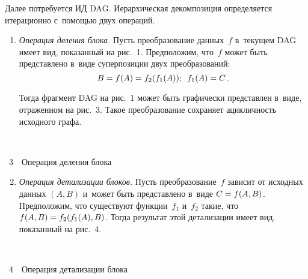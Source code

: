 \begin{multicols}{2}
  Далее потребуется ИД DAG. Иерархическая декомпозиция определяется 
итерационно с~по\-мощью двух операций. 




  \begin{enumerate}[1.]
  \item \textit{Операция деления блока.} Пусть преобразование данных~$f$ 
в~текущем DAG имеет вид, показанный на рис.~1. Предположим, что~$f$ может 
быть представлено в~виде суперпозиции двух преобразований: 
$$
B\hm= f(A)\hm= 
f_2(f_1(A));\enskip  f_1(A)\hm=C\,.
$$ 

Тогда фрагмент DAG на рис.~1 может быть 
графически представлен в~виде, отраженном на рис.~3.
%
  Такое преобразование сохраняет ацикличность исходного графа. 
  
  \end{enumerate}
  
  { \begin{center}  %
 \vspace*{6pt}
    \mbox{%
 \epsfxsize=79mm 
 }
\vspace*{6pt}

\noindent
{{\figurename~3}\ \ \small{Операция деления блока
}}

\end{center}
}

\vspace*{3pt}

\begin{enumerate}[1.]
\setcounter{enumi}{1}
  \item \textit{Операция детализации блоков.} Пусть преобразование~$f$ зависит 
от исходных данных $(A, B)$ и~может быть представлено в~виде $C\hm= f(A,B)$. 
Предположим, что существуют функции~$f_1$ и~$f_2$ такие, что $f(A,B)\hm= 
f_2(f_1(A),B)$. Тогда результат этой детализации имеет вид, показанный на 
рис.~4.
  \end{enumerate}
  

\vspace*{3pt}
  
{ \begin{center}  %
    \mbox{%
 \epsfxsize=79mm 
 }
\vspace*{6pt}

\noindent
{{\figurename~4}\ \ \small{Операция детализации блока
}}

\end{center}
}

\vspace*{6pt}


\end{multicols}
